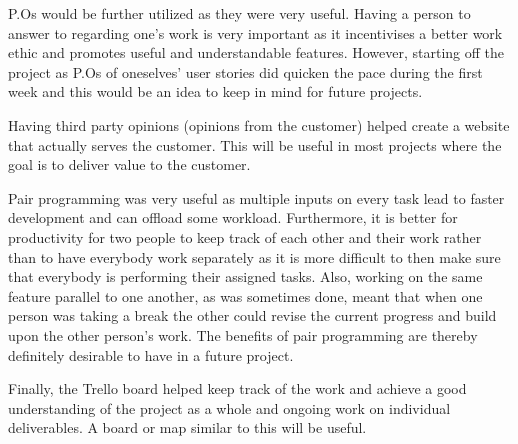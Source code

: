 P.Os would be further utilized as they were very useful. Having a person to answer to regarding one's work is very important as it incentivises a better work ethic and promotes useful and understandable features. However, starting off the project as P.Os of oneselves’ user stories did quicken the pace during the first week and this would be an idea to keep in mind for future projects.

Having third party opinions (opinions from the customer) helped create a website that actually serves the customer. This will be useful in most projects where the goal is to deliver value to the customer.

Pair programming was very useful as multiple inputs on every task lead to faster development and can offload some workload. Furthermore, it is better for productivity for two people to keep track of each other and their work rather than to have everybody work separately as it is more difficult to then make sure that everybody is performing their assigned tasks. Also, working on the same feature parallel to one another, as was sometimes done, meant that when one person was taking a break the other could revise the current progress and build upon the other person’s work. The benefits of pair programming are thereby definitely desirable to have in a future project.

Finally, the Trello board helped keep track of the work and achieve a good understanding of the project as a whole and ongoing work on individual deliverables. A board or map similar to this will be useful.



